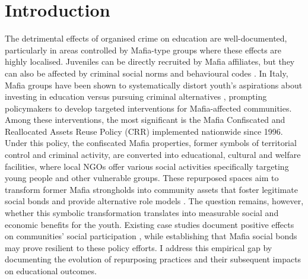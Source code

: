 \documentclass[12pt]{article}
\theoremstyle{plain}
\theoremstyle{plain}
\theoremstyle{plain}
\theoremstyle{definition}
\theoremstyle{plain}
\theoremstyle{definition}
\theoremstyle{plain}
\theoremstyle{remark}
\theoremstyle{definition}
\theoremstyle{definition}
\theoremstyle{plain}
\begin{document}
\FloatBarrier
\section{Introduction}
\label{sec:jmp_intro}


The detrimental effects of organised crime on education are well-documented, particularly in areas controlled by Mafia-type groups where these effects are highly localised. Juveniles can be directly recruited by Mafia affiliates, but they can also be affected by criminal social norms and behavioural codes \citep{van_dijk_children_2019, kleemans_criminal_2008}. In Italy, Mafia groups have been shown to systematically distort youth's aspirations about investing in education versus pursuing criminal alternatives \citep{acemoglu_weak_2020,coniglio_organized_2010, caglayan_organized_2017}, prompting policymakers to develop targeted interventions for Mafia-affected communities. Among these interventions, the most significant is the Mafia Confiscated and Reallocated Assets Reuse Policy (CRR) implemented nationwide since 1996. Under this policy, the confiscated Mafia properties, former symbols of territorial control and criminal activity, are converted into educational, cultural and welfare facilities, where local NGOs offer various social activities specifically targeting young people and other vulnerable groups. These repurposed spaces aim to transform former Mafia strongholds into community assets that foster legitimate social bonds and provide alternative role models \citep{falcone_beneitalia_2016}. The question remains, however, whether this symbolic transformation translates into measurable social and economic benefits for the youth. Existing case studies document positive effects on communities' social participation \citep{nazzaro_il_2021, martone_politiche_2020}, while establishing that Mafia social bonds may prove resilient to these policy efforts. I address this empirical gap by documenting the evolution of repurposing practices and their subsequent impacts on educational outcomes. \par
\medskip
\end{document}
